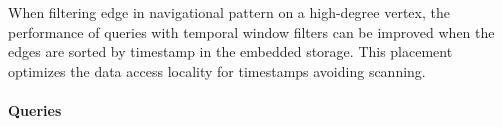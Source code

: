 
When filtering edge in navigational pattern on a high-degree vertex, the
performance of queries with temporal window filters can be improved when the
edges are sorted by timestamp in the embedded storage. This placement optimizes
the data access locality for timestamps avoiding scanning.


\paragraph{Queries}
{\raggedright
}